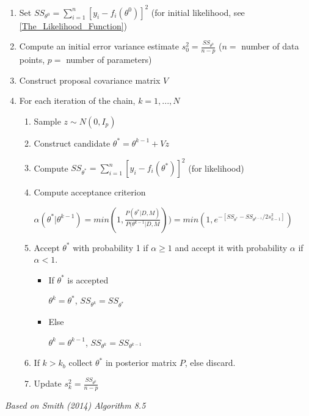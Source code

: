 \documentclass{article}
\begin{document}
\begin{tcolorbox}
\begin{enumerate}
    \item Set $SS_{\theta^0} = \sum_{i = 1}^{n}[y_i - f_i(\theta^0)]^2$ (for initial likelihood, see \ref{The_Likelihood_Function})
    \item Compute an initial error variance estimate $s_0^2 = \frac{SS_{\theta^0}}{n-p}$ ($n = $ number of data points, $p = $ number of parameters)
    \item Construct proposal covariance matrix $V$
    \item \label{step:6met}For each iteration of the chain, $k = 1,...,N$ 
    \begin{enumerate}
        \item Sample $z \sim N(0,I_p)$ 
        \item Construct candidate $\theta^* = \theta^{k-1}+ Vz$
        \item Compute $SS_{\theta^*} = \sum_{i = 1}^{n}[y_i - f_i(\theta^*)]^2$ (for likelihood)
        \item Compute acceptance criterion
            \begin{center}
                $\alpha(\theta^* | \theta^{k-1}) = min(1, \frac{P(\theta^* |D, M)}{P(\theta^{k-1}|D, M})) = min(1, e^{-[SS_{\theta^*}-SS_{\theta^{k-1}}/2s_{k-1}^2]})$
            \end{center}
        \item Accept $\theta^*$ with probability 1 if $\alpha \geq 1$ and accept it with probability $\alpha$ if $\alpha < 1$.
        \begin{itemize}
            \item If $\theta^*$ is accepted
            \begin{center}
                $\theta^k = \theta^*$, $SS_{\theta^k} = SS_{\theta^*}$
            \end{center}
            \item Else
            \begin{center}
                $\theta^k = \theta^{k-1}$, $SS_{\theta^k} = SS_{\theta^{k-1}}$
            \end{center}
        \end{itemize}
        \item If $k > k_b$ collect $\theta^*$ in posterior matrix $P$, else discard.
        \item Update $s_k^2 = \frac{SS_{\theta^k}}{n-p}$
    \end{enumerate}
\end{enumerate}
\emph{Based on Smith (2014) Algorithm 8.5}
\end{tcolorbox}
\end{document}
